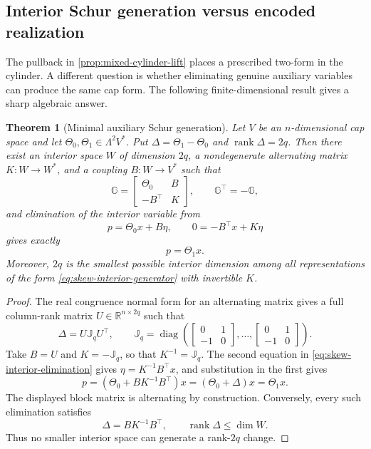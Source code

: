 \documentclass[11pt,a4paper]{article}
\newtheorem{theorem}{Theorem}[section]
\begin{document}
\subsection{Interior Schur generation versus encoded realization}

The pullback in \cref{prop:mixed-cylinder-lift} places a prescribed
two-form in the cylinder.  A different question is whether eliminating
genuine auxiliary variables can produce the same cap form.  The following
finite-dimensional result gives a sharp algebraic answer.

\begin{theorem}[Minimal auxiliary Schur generation]
\label{thm:minimal-schur-gauge-generation}
Let \(V\) be an \(n\)-dimensional cap space and let
\(\Theta_0,\Theta_1\in\Lambda^2V^*\).  Put
\(\Delta=\Theta_1-\Theta_0\) and
\(\operatorname{rank}\Delta=2q\).  Then there exist an interior space
\(W\) of dimension \(2q\), a nondegenerate alternating matrix
\(K:W\to W^*\), and a coupling \(B:W\to V^*\) such that
\begin{equation}\label{eq:skew-interior-generator}
 \mathbb G=
 \begin{bmatrix}
  \Theta_0&B\\-B^\top&K
 \end{bmatrix},
 \qquad \mathbb G^\top=-\mathbb G,
\end{equation}
and elimination of the interior variable from
\begin{equation}\label{eq:skew-interior-elimination}
 p=\Theta_0x+B\eta,
 \qquad 0=-B^\top x+K\eta
\end{equation}
gives exactly
\begin{equation}\label{eq:schur-generated-cap-gauge}
 p=\Theta_1x.
\end{equation}
Moreover, \(2q\) is the smallest possible interior dimension among all
representations of the form \cref{eq:skew-interior-generator} with
invertible \(K\).
\end{theorem}

\begin{proof}
The real congruence normal form for an alternating matrix gives a full
column-rank matrix \(U\in\mathbb R^{n\times2q}\) such that
\[
 \Delta=U\mathbb J_qU^\top,
 \qquad
 \mathbb J_q=\operatorname{diag}\!\left(
 \begin{bmatrix}0&1\\-1&0\end{bmatrix},\ldots,
 \begin{bmatrix}0&1\\-1&0\end{bmatrix}\right).
\]
Take \(B=U\) and \(K=-\mathbb J_q\), so that
\(K^{-1}=\mathbb J_q\).  The second equation in
\cref{eq:skew-interior-elimination} gives
\(\eta=K^{-1}B^\top x\), and substitution in the first gives
\[
 p=(\Theta_0+BK^{-1}B^\top)x
   =(\Theta_0+\Delta)x=\Theta_1x.
\]
The displayed block matrix is alternating by construction.  Conversely,
every such elimination satisfies
\[
 \Delta=BK^{-1}B^\top,
 \qquad
 \operatorname{rank}\Delta\le\dim W.
\]
Thus no smaller interior space can generate a rank-\(2q\) change.
\end{proof}
\end{document}
